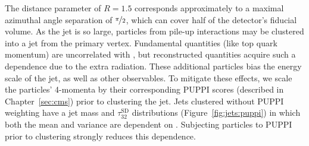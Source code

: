 The distance parameter of $R=1.5$ corresponds approximately to a maximal azimuthal angle separation of $\nicefrac{\pi}{2}$, which can cover half of the detector's fiducial volume.
As the jet is so large, particles from pile-up interactions may be clustered into a jet from the primary vertex.
Fundamental quantities (like top quark momentum) are uncorrelated with \NPV, but reconstructed quantities acquire such a dependence due to the extra radiation.
These additional particles bias the energy scale of the jet, as well as other observables.
To mitigate these effects, we scale the particles' 4-momenta by their corresponding PUPPI scores (described in Chapter~\ref{sec:cms}) prior to clustering the jet.
Jets clustered without PUPPI weighting have a jet mass and $\tau_{32}^\mathrm{SD}$ distributions (Figure~\ref{fig:jets:puppi}) in which both the mean and variance are dependent on \NPV.
Subjecting particles to PUPPI prior to clustering strongly reduces this dependence.

